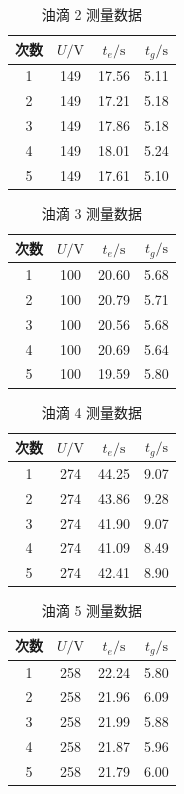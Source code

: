 \documentclass[a4paper,8pt,twocolumn]{article}
\begin{document}
\begin{table}[H]
\centering
\caption{油滴 2 测量数据}
\begin{tabular}{cccc}
\hline
次数 & $U/\mathrm{V}$ & $t_e/\mathrm{s}$ & $t_g/\mathrm{s}$ \\
\hline
1 & 149 & 17.56 & 5.11 \\
2 & 149 & 17.21 & 5.18 \\
3 & 149 & 17.86 & 5.18 \\
4 & 149 & 18.01 & 5.24 \\
5 & 149 & 17.61 & 5.10 \\
\hline
\end{tabular}
\end{table}

\begin{table}[H]
\centering
\caption{油滴 3 测量数据}
\begin{tabular}{cccc}
\hline
次数 & $U/\mathrm{V}$ & $t_e/\mathrm{s}$ & $t_g/\mathrm{s}$ \\
\hline
1 & 100 & 20.60 & 5.68 \\
2 & 100 & 20.79 & 5.71 \\
3 & 100 & 20.56 & 5.68 \\
4 & 100 & 20.69 & 5.64 \\
5 & 100 & 19.59 & 5.80 \\
\hline
\end{tabular}
\end{table}

\begin{table}[H]
\centering
\caption{油滴 4 测量数据}
\begin{tabular}{cccc}
\hline
次数 & $U/\mathrm{V}$ & $t_e/\mathrm{s}$ & $t_g/\mathrm{s}$ \\
\hline
1 & 274 & 44.25 & 9.07 \\
2 & 274 & 43.86 & 9.28 \\
3 & 274 & 41.90 & 9.07 \\
4 & 274 & 41.09 & 8.49 \\
5 & 274 & 42.41 & 8.90 \\
\hline
\end{tabular}
\end{table}

\begin{table}[H]
\centering
\caption{油滴 5 测量数据}
\begin{tabular}{cccc}
\hline
次数 & $U/\mathrm{V}$ & $t_e/\mathrm{s}$ & $t_g/\mathrm{s}$ \\
\hline
1 & 258 & 22.24 & 5.80 \\
2 & 258 & 21.96 & 6.09 \\
3 & 258 & 21.99 & 5.88 \\
4 & 258 & 21.87 & 5.96 \\
5 & 258 & 21.79 & 6.00 \\
\hline
\end{tabular}
\end{table}
\end{document}
